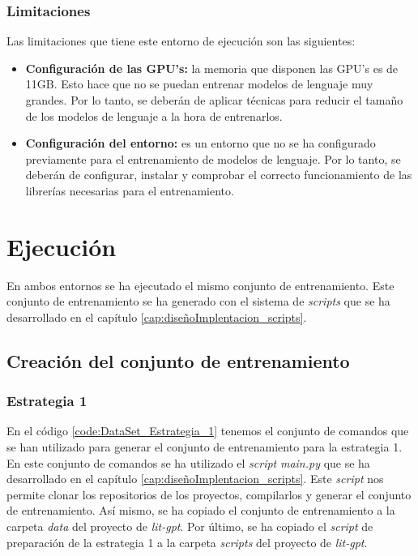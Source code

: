\subsubsection{Limitaciones}
\label{subsubsec:limitaciones}


Las limitaciones que tiene este entorno de ejecución son las siguientes:

\begin{itemize}
    \item \textbf{Configuración de las GPU's:} la memoria que disponen las GPU's es de 11GB.
        Esto hace que no se puedan entrenar modelos de lenguaje muy grandes. Por lo tanto,
        se deberán de aplicar técnicas para reducir el tamaño de los modelos de lenguaje a la
        hora de entrenarlos.
    \item \textbf{Configuración del entorno:} es un entorno que no se ha configurado previamente
        para el entrenamiento de modelos de lenguaje. Por lo tanto, se deberán de configurar, instalar
        y comprobar el correcto funcionamiento de las librerías necesarias para el entrenamiento.
\end{itemize}

\section{Ejecución}
\label{sec:ejecucion}

En ambos entornos se ha ejecutado el mismo conjunto de entrenamiento. Este conjunto de
entrenamiento se ha generado con el sistema de \textit{scripts} que se ha desarrollado en el capítulo
\ref{cap:diseñoImplentacion_scripts}.

\subsection{Creación del conjunto de entrenamiento}
\label{subsec:creacion_conjunto_entrenamiento}

\subsubsection{Estrategia 1}
\label{subsubsec:creacion_conjunto:estrategia_1}


En el código \ref{code:DataSet_Estrategia_1} tenemos el conjunto de comandos que se han
utilizado para generar el conjunto de entrenamiento para la estrategia 1. En este conjunto
de comandos se ha utilizado el \textit{script} \textit{main.py} que se ha desarrollado en el capítulo
\ref{cap:diseñoImplentacion_scripts}. Este \textit{script} nos permite clonar los repositorios de
los proyectos, compilarlos y generar el conjunto de entrenamiento. Así mismo, se ha copiado
el conjunto de entrenamiento a la carpeta \textit{data} del proyecto de \textit{lit-gpt}.
Por último, se ha copiado el \textit{script} de preparación de la estrategia 1 a la carpeta \textit{scripts}
del proyecto de \textit{lit-gpt}.

